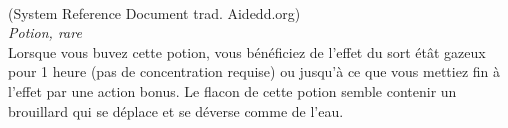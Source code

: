 \\
{\small (System Reference Document trad. Aidedd.org)}\\
{\small \it Potion, rare}\\
Lorsque vous buvez cette potion, vous bénéficiez de l'effet du sort étât gazeux pour 1 heure (pas de concentration requise) ou jusqu'à ce que vous mettiez fin à l'effet par une action bonus. Le flacon de cette potion semble contenir un brouillard qui se déplace et se déverse comme de l'eau. \\

